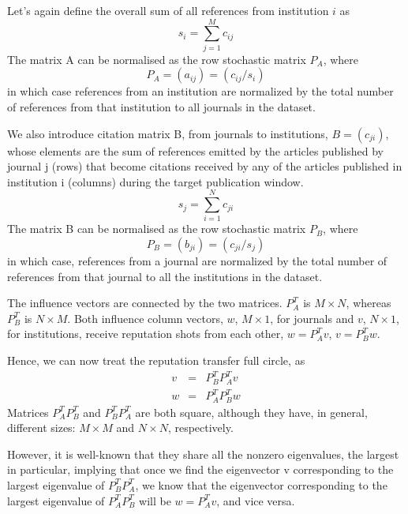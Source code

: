 \documentclass[10pt]{article}
\begin{document}
\noindent Let's again define the overall sum of all references from institution $i$ as
\begin{equation}
s_i = \sum_{j=1}^Mc_{ij}
\end{equation}
The matrix A can be normalised as the row stochastic matrix $P_A$, where
\begin{equation}
P_A = (a_{ij}) = (c_{ij}/s_i)
\label{pa}
\end{equation}
in which case references from an institution are normalized by the total number of references from that institution to all journals in the dataset.


We also  introduce  citation matrix B, from journals  to institutions, $B = (c_{ji})$,  whose elements are the sum of references emitted by
the articles published by journal j (rows) that become citations received by any of the articles published in institution i (columns) during the target
publication window.
\begin{equation}
s_j = \sum_{i=1}^Nc_{ji}
\end{equation}
The matrix B can be normalised as the row stochastic matrix $P_B$, where
\begin{equation}
P_B = (b_{ji}) = (c_{ji}/s_j)
\label{pb}
\end{equation}
in which case, references from a journal are normalized by the total number of references from that journal to all the institutions in the dataset.



The influence vectors are connected by the two matrices. $P_A^T$ is $M\times N$, whereas $P_B^T$ is $N\times M$. Both influence column vectors, $w$, $M\times1$, for journals and $v$, $N\times1$, for institutions, receive reputation shots from each other, $w=P_A^Tv$, $v=P_B^Tw$.

Hence, we can now treat the reputation transfer full circle, as
\begin{eqnarray}
 v & = & P_B^TP_A^Tv\\
 w & = & P_A^TP_B^Tw
 \end{eqnarray}
 Matrices $P_A^TP_B^T$ and $P_B^TP_A^T$ are both square, although they have, in general, different sizes: $M\times M$ and $N\times N$, respectively.

 However, it is well-known that they share all the nonzero eigenvalues, the largest in particular, implying that once we find the eigenvector v corresponding to the largest eigenvalue of $P_B^TP_A^T$, we know that the eigenvector corresponding to the largest eigenvalue of $P_A^TP_B^T$ will be $w=P_A^Tv$, and vice versa.
\end{document}
